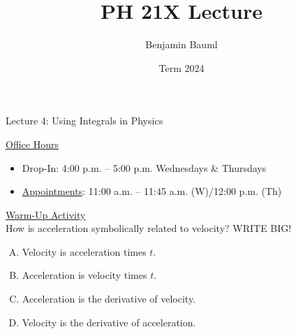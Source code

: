 \documentclass[]{article}
\title{PH 21X Lecture \Week}
\author{Benjamin Bauml}
\date{Term 2024}
\begin{document}
\begin{TeacherMargin}

\end{TeacherMargin}
\begin{PresentSpace}
\begin{center}
	\huge Lecture 4: Using Integrals in Physics
\end{center}
\vspace{0.2cm}
\underline{Office Hours} \\
\vspace{-20pt}
\begin{itemize}
	\item Drop-In: 4:00 p.m. -- 5:00 p.m. Wednesdays \& Thursdays
	\item \href{https://outlook.office.com/bookwithme/user/8a879d0af7bf45e890abd3d888d8bfe4@oregonstate.edu?anonymous&ep=plink}{\color{blue}Appointments}: 11:00 a.m. -- 11:45 a.m. (W)/12:00 p.m. (Th)
\end{itemize}
\underline{Warm-Up Activity} \\
How is acceleration symbolically related to velocity? WRITE BIG!
\begin{multicols}{2}
\begin{enumerate}[(A)]
	\item Velocity is acceleration times $t$.
	\vspace{6pt}
	\item Acceleration is velocity times $t$.
	\vspace{15pt}
	\item Acceleration is the derivative of velocity.
	\item Velocity is the derivative of acceleration.
\end{enumerate}
\end{multicols}
\end{PresentSpace}
\newpage
\begin{TeacherMargin}

\end{TeacherMargin}
\end{document}
